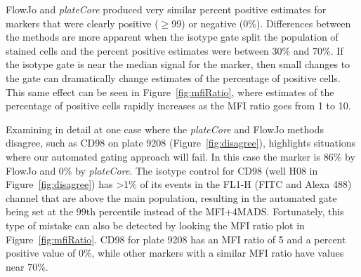 \documentclass[12pt]{article}
\newcommand{\Rpackage}[1]{{\textit{#1}}}
\begin{document}
FlowJo and \Rpackage{plateCore} produced very similar percent positive
estimates for markers that were clearly positive ($\ge$99) or negative (0\%).
Differences between the methods are more apparent when the isotype gate split
the population of stained cells and the percent positive estimates were between
30\% and 70\%. If the isotype gate is near the median signal for the marker,
then small changes to the gate can dramatically change estimates of the
percentage of positive cells. This same effect can be seen in
Figure~\ref{fig:mfiRatio}, where estimates of the percentage of positive cells
rapidly increases as the MFI ratio goes from 1 to 10.

Examining in detail at one case where the \Rpackage{plateCore} and FlowJo
methods disagree, such as CD98 on plate 9208 (Figure~\ref{fig:disagree}),
highlights situations where our automated gating approach will fail. In this
case the marker is 86\% by FlowJo and 0\% by \Rpackage{plateCore}. The isotype
control for CD98 (well H08 in Figure~\ref{fig:disagree}) has >1\% of its events
in the FL1-H (FITC and Alexa 488) channel that are above the main population,
resulting in the automated gate being set at the 99th percentile instead of the
MFI+4MADS. Fortunately, this type of mistake can also be detected by looking
the MFI ratio plot in Figure~\ref{fig:mfiRatio}. CD98 for plate 9208 has an MFI
ratio of 5 and a percent positive value of 0\%, while other markers with a
similar MFI ratio have values near 70\%. 
\end{document}
